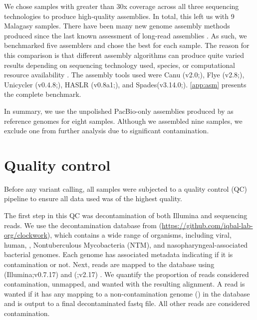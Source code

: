 We chose samples with greater than 30x coverage across all three sequencing technologies to produce high-quality assemblies. In total, this left us with 9 Malagasy samples. There have been many new genome assembly methods produced since the last known assessment of \mtb{} long-read assemblies \cite{bainomugisa2018}. As such, we benchmarked five assemblers and chose the best for each sample. The reason for this comparison is that different assembly algorithms can produce quite varied results depending on sequencing technology used, species, or computational resource availability \cite{wick2020,demaio2019}. The assembly tools used were Canu (v2.0;\cite{koren2017,nurk2020}), Flye (v2.8;\cite{flye2019}), Unicycler (v0.4.8;\cite{wick2017}), HASLR (v0.8a1;\cite{haslr2020}), and Spades(v3.14.0;\cite{antipov2016}). \autoref{app:asm} presents the complete benchmark.

In summary, we use the unpolished PacBio-only assemblies produced by \flye{} as reference genomes for eight samples. Although we assembled nine samples, we exclude one from further analysis due to significant contamination.


\section{Quality control}
\label{sec:ch2-qc}

Before any variant calling, all samples were subjected to a quality control (QC) pipeline to ensure all data used was of the highest quality. 

The first step in this QC was decontamination of both Illumina and \ont{} sequencing reads. We use the decontamination database from  (\url{https://github.com/iqbal-lab-org/clockwork}), which contains a wide range of organisms, including viral, human, \mtb{}, Nontuberculous Mycobacteria (NTM), and nasopharyngeal-associated bacterial genomes. Each genome has associated metadata indicating if it is contamination or not. Next, reads are mapped to the database using  (Illumina;v0.7.17) \cite{li2013} and  (\ont{};v2.17) \cite{li2018}. We quantify the proportion of reads considered contamination, unmapped, and wanted with the resulting alignment. A read is wanted if it has any mapping to a non-contamination genome (\mtb{}) in the database and is output to a final decontaminated fastq file. All other reads are considered contamination. 

